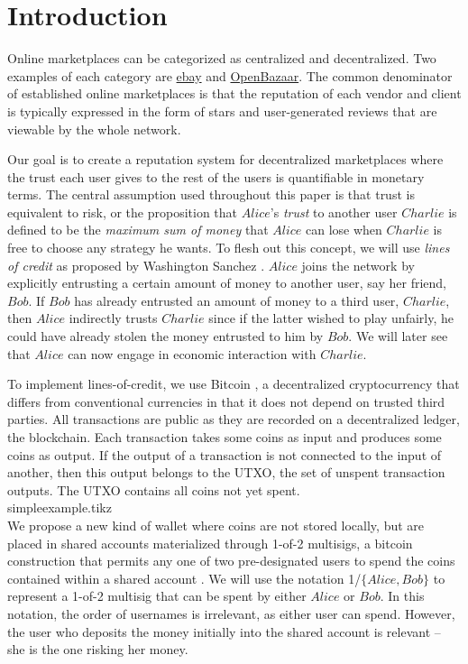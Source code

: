 \section{Introduction}
  Online marketplaces can be categorized as centralized and decentralized.
  Two examples of each category are \href{http://www.ebay.com}{ebay} and \href{https://openbazaar.org/}{OpenBazaar}.
  The common denominator of established online marketplaces is that the reputation of each vendor and client is typically
  expressed in the form of stars and user-generated reviews that are viewable by the whole network.

  Our goal is to create a reputation system for decentralized marketplaces where the trust each user gives to the rest of
  the users is quantifiable in monetary terms. The central assumption used throughout this paper
  is that trust is equivalent to risk, or the proposition that $Alice$'s \textit{trust} to another user $Charlie$ is defined
  to be the \textit{maximum sum of money} that $Alice$ can lose when $Charlie$ is free to choose any strategy he wants. To
  flesh out this concept, we will use \textit{lines of credit} as proposed by Washington Sanchez \cite{loc}. $Alice$ joins
  the network by explicitly entrusting a certain amount of money to another user, say her friend, $Bob$. If $Bob$ has already
  entrusted an amount of money to a third user, $Charlie$, then $Alice$ indirectly trusts $Charlie$ since if the latter
  wished to play unfairly, he could have already stolen the money entrusted to him by $Bob$. We will later see that $Alice$
  can now engage in economic interaction with $Charlie$.

  To implement lines-of-credit, we use Bitcoin \cite{bitcoin}, a decentralized cryptocurrency that differs from conventional
  currencies in that it does not depend on trusted third parties. All transactions are public as they are recorded on a
  decentralized ledger, the blockchain. Each transaction takes some coins as input and produces some coins as output. If the
  output of a transaction is not connected to the input of another, then this output belongs to the UTXO, the set of unspent
  transaction outputs. The UTXO contains all coins not yet spent.
  \medskip \ \\
  {simpleexample.tikz} \smallskip \ \\
  We propose a new kind of wallet where coins are not stored locally, but are placed in shared accounts materialized through
  1-of-2 multisigs, a bitcoin construction that permits any one of two pre-designated users to spend the coins contained
  within a shared account \cite{masteringbitcoin}. We will use the notation 1/$\{Alice, Bob\}$ to represent a 1-of-2
  multisig that can be spent by either $Alice$ or $Bob$. In this notation, the order of usernames is irrelevant, as either
  user can spend. However, the user who deposits the money initially into the shared account is relevant -- she is the one
  risking her money.

